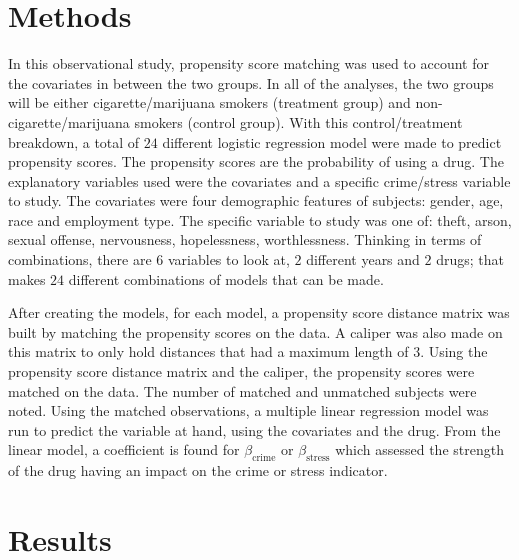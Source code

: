 \documentclass[a4paper, 10pt, conference]{ieeeconf}      %
\begin{document}
\section{Methods} 
\parindent 10pt In this observational study, propensity score matching was used to account for the covariates in between the two groups. In all of the analyses, the two groups will be either cigarette/marijuana smokers (treatment group) and non-cigarette/marijuana smokers (control group). With this control/treatment breakdown, a total of $24$ different logistic regression model were made to predict propensity scores. The propensity scores are the probability of using a drug. The explanatory variables used were the covariates and a specific crime/stress variable to study. The covariates were four demographic features of subjects: gender, age, race and employment type. The specific variable to study was one of: theft, arson, sexual offense, nervousness, hopelessness, worthlessness. Thinking in terms of combinations, there are $6$ variables to look at, $2$ different years and $2$ drugs; that makes $24$ different combinations of models that can be made.

After creating the models, for each model, a propensity score distance matrix was built by matching the propensity scores on the data. A caliper was also made on this matrix to only hold distances that had a maximum length of $3$. Using the propensity score distance matrix and the caliper, the propensity scores were matched on the data. The number of matched and unmatched subjects were noted. Using the matched observations, a multiple linear regression model was run to predict the variable at hand, using the covariates and the drug. From the linear model, a coefficient is found for $\beta_{\text{crime}}$ or $\beta_{\text{stress}}$ which assessed the strength of the drug having an impact on the crime or stress indicator. 

\section{Results}
\end{document}
